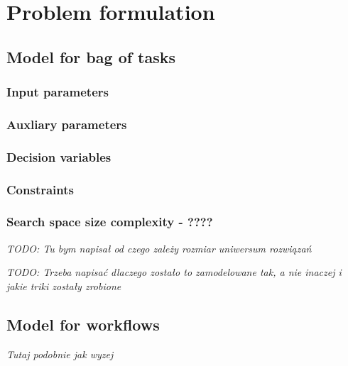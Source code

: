 \chapter{Problem formulation}
\label{chap:formulation} 


\section{Model for bag of tasks}

\subsection{Input parameters}

\subsection{Auxliary parameters}

\subsection{Decision variables}

\subsection{Constraints}

\subsection{Search space size complexity - ????}

\emph{TODO: Tu bym napisał od czego zależy rozmiar uniwersum rozwiązań}

\emph{TODO: Trzeba napisać dlaczego zostało to zamodelowane tak, a nie inaczej i jakie triki zostały zrobione}

\section{Model for workflows}

\emph{Tutaj podobnie jak wyzej}